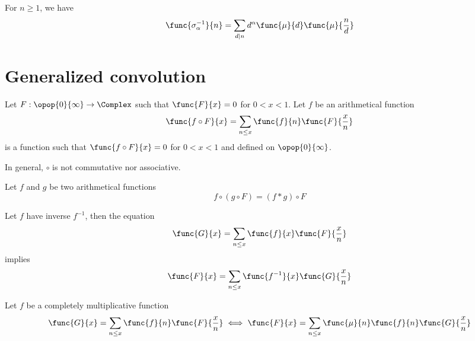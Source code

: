 \begin{theorem}
    For \(n \geq 1\), we have 
    \begin{equation*}
        \func{\sigma_{\alpha}^{-1}}{n} = \sum_{d \mid n} d^{\alpha} \func{\mu}{d} \func{\mu}{\frac{n}{d}}
    \end{equation*}
\end{theorem}

\section{Generalized convolution}
Let \(F: \opop{0}{\infty} \to \Complex\) such that \(\func{F}{x} = 0\) for \(0 < x < 1\). Let \(f\) be an arithmetical function 
\begin{equation*}
    \func{f \circ F}{x} = \sum_{n \leq x} \func{f}{n} \func{F}{\frac{x}{n}}
\end{equation*}
is a function such that \(\func{f \circ F}{x} = 0\) for \(0 < x < 1\) and defined on \(\opop{0}{\infty}\). 
\begin{remark}
    In general, \(\circ\) is not commutative nor associative.
\end{remark}
\begin{theorem}
    Let \(f\) and \(g\) be two arithmetical functions
    \begin{equation*}
        f \circ (g \circ F) = (f \ast g) \circ F
    \end{equation*}
\end{theorem}
\begin{theorem} 
    Let \(f\) have inverse \(f^{-1}\), then the equation 
    \begin{equation*}
        \func{G}{x} = \sum_{n \leq x} \func{f}{x} \func{F}{\frac{x}{n}}
    \end{equation*}
    implies 
    \begin{equation*}
        \func{F}{x} = \sum_{n \leq x} \func{f^{-1}}{x} \func{G}{\frac{x}{n}}
    \end{equation*}
\end{theorem}

\begin{theorem}
    Let \(f\) be a completely multiplicative function 
    \begin{equation*}
        \func{G}{x} = \sum_{n \leq x} \func{f}{n}\func{F}{\frac{x}{n}} \iff \func{F}{x} = \sum_{n \leq x} \func{\mu}{n} \func{f}{n} \func{G}{\frac{x}{n}}
    \end{equation*}    
\end{theorem}
